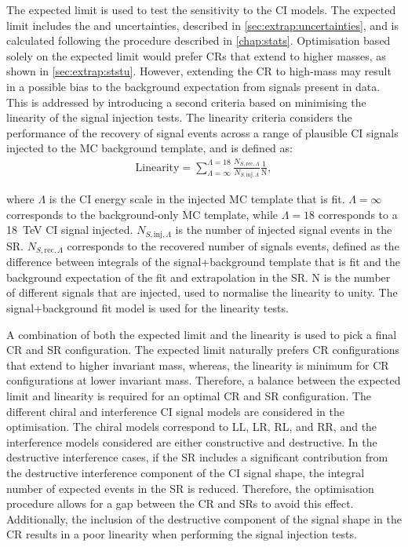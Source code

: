 The expected limit is used to test the sensitivity to the CI models. The expected limit includes the \ISSU and \STATU uncertainties, described in \cref{sec:extrap:uncertainties}, and is calculated following the procedure described in \cref{chap:stats}. Optimisation based solely on the expected limit would prefer CRs that extend to higher masses, as shown in \cref{sec:extrap:ststu}. However, extending the CR to high-mass may result in a possible bias to the background expectation from signals present in data. This is addressed by introducing a second criteria based on minimising the linearity of the signal injection tests. The linearity criteria considers the performance of the recovery of signal events across a range of plausible CI signals injected to the MC background template, and is defined as: 
\begin{equation}
    \label{eq:linearity}
    \begin{aligned}
        \mathrm{Linearity} = \sum^{\Lambda = 18}_{\Lambda = \infty} \frac{N_{S,\mathrm{rec},\Lambda}}{N_{S,\mathrm{inj},\Lambda}}  \frac{1}{\mathrm{N}},
    \end{aligned}
\end{equation}

where $\Lambda$ is the CI energy scale in the injected MC template that is fit. $\Lambda = \infty$ corresponds to the background-only MC template, while $\Lambda = 18$ corresponds to a \SI{18}{\tera\electronvolt} CI signal injected. $N_{S,\mathrm{inj},\Lambda}$ is the number of injected signal events in the SR. $N_{S,\mathrm{rec},\Lambda}$ corresponds to the recovered number of signals events, defined as the difference between integrals of the signal+background template that is fit and the background expectation of the fit and extrapolation in the SR. N is the number of different signals that are injected, used to normalise the linearity to unity. The signal+background fit model is used for the linearity tests. 

A combination of both the expected limit and the linearity is used to pick a final CR and SR configuration. The expected limit naturally prefers CR configurations that extend to higher invariant mass, whereas, the linearity is minimum for CR configurations at lower invariant mass. Therefore, a balance between the expected limit and linearity is required for an optimal CR and SR configuration. The different chiral and interference CI signal models are considered in the optimisation. The chiral models correspond to LL, LR, RL, and RR, and the interference models considered are either constructive and destructive. In the destructive interference cases, if the SR includes a significant contribution from the destructive interference component of the CI signal shape, the integral number of expected events in the SR is reduced. Therefore, the optimisation procedure allows for a gap between the CR and SRs to avoid this effect. Additionally, the inclusion of the destructive component of the signal shape in the CR results in a poor linearity when performing the signal injection tests. 

